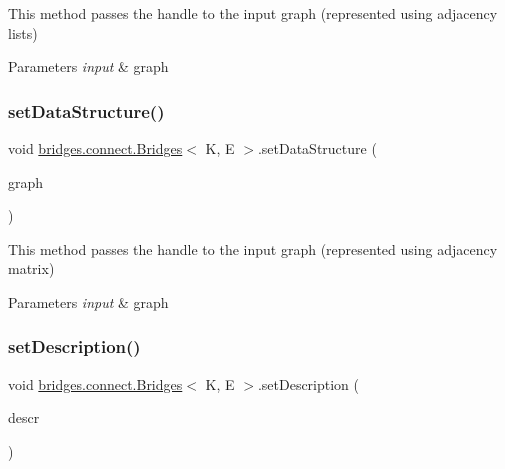 This method passes the handle to the input graph (represented using adjacency lists)


\begin{DoxyParams}{Parameters}
{\em input} & graph \\
\hline
\end{DoxyParams}
\hypertarget{classbridges_1_1connect_1_1_bridges_a1ac1f8a7c5e95500712c2edaa5e8971f}{}\label{classbridges_1_1connect_1_1_bridges_a1ac1f8a7c5e95500712c2edaa5e8971f} 
\subsubsection{\texorpdfstring{set\+Data\+Structure()}{setDataStructure()}\hspace{0.1cm}{\footnotesize\ttfamily [12/12]}}
{\footnotesize\ttfamily void \hyperlink{classbridges_1_1connect_1_1_bridges}{bridges.\+connect.\+Bridges}$<$ K, E $>$.set\+Data\+Structure (\begin{DoxyParamCaption}\item[{\hyperlink{classbridges_1_1base_1_1_graph_adj_matrix}{Graph\+Adj\+Matrix}$<$ K, E $>$}]{graph }\end{DoxyParamCaption})}

This method passes the handle to the input graph (represented using adjacency matrix)


\begin{DoxyParams}{Parameters}
{\em input} & graph \\
\hline
\end{DoxyParams}
\hypertarget{classbridges_1_1connect_1_1_bridges_a161206b37c2acdf435f4444679616eec}{}\label{classbridges_1_1connect_1_1_bridges_a161206b37c2acdf435f4444679616eec} 
\subsubsection{\texorpdfstring{set\+Description()}{setDescription()}}
{\footnotesize\ttfamily void \hyperlink{classbridges_1_1connect_1_1_bridges}{bridges.\+connect.\+Bridges}$<$ K, E $>$.set\+Description (\begin{DoxyParamCaption}\item[{String}]{descr }\end{DoxyParamCaption})}



